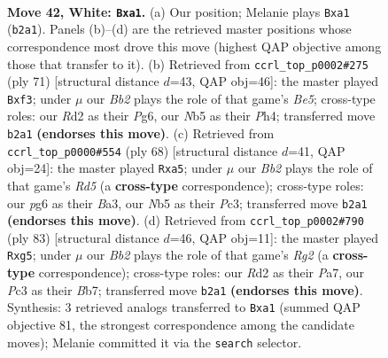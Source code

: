 \documentclass[11pt]{article}
\begin{document}
\clearpage

\begin{figure}[p]\centering
\begin{subfigure}{0.46\textwidth}\centering
\resizebox{\linewidth}{!}{%
\newchessgame
\chessboard[
  setfen={5k2/1p2p2p/n5p1/pNp5/5r1P/2P2P2/PB1R4/n4K2 w - - 0 42},
  showmover=false,
  pgfstyle=straightmove, color=movearrow, markmove={b2-a1}
]}
\caption{}
\end{subfigure}\hfill
\begin{subfigure}{0.46\textwidth}\centering
\resizebox{\linewidth}{!}{%
\newchessgame
\chessboard[
  setfen={6k1/8/1p3pp1/3p4/4bP1p/2P2N1P/rP1R1KP1/8 b - - 1 36},
  showmover=false,
  pgfstyle=straightmove, color=movearrow, markmove={e4-f3}
]}
\caption{}
\end{subfigure}
\\[4pt]
\begin{subfigure}{0.46\textwidth}\centering
\resizebox{\linewidth}{!}{%
\newchessgame
\chessboard[
  setfen={3r2k1/7p/3P1pp1/p2R1n2/2p2P2/B1P5/2P2K1P/8 w - - 2 35},
  showmover=false,
  pgfstyle=straightmove, color=movearrow, markmove={d5-a5}
]}
\caption{}
\end{subfigure}\hfill
\begin{subfigure}{0.46\textwidth}\centering
\resizebox{\linewidth}{!}{%
\newchessgame
\chessboard[
  setfen={4k3/pb4r1/1p1p4/1P1Pp1Bp/4P3/PK4P1/8/1N5R b - - 0 42},
  showmover=false,
  pgfstyle=straightmove, color=movearrow, markmove={g7-g5}
]}
\caption{}
\end{subfigure}
\caption{\textbf{Move 42, White: \texttt{Bxa1}.} (a) Our position; Melanie plays \texttt{Bxa1} (\texttt{b2a1}). Panels (b)--(d) are the retrieved master positions whose correspondence most drove this move (highest QAP objective among those that transfer to it). (b) Retrieved from \texttt{ccrl\_top\_p0002\#275} (ply 71) [structural distance $d$=43, QAP obj=46]: the master played \texttt{Bxf3}; under $\mu$ our \emph{Bb2} plays the role of that game's \emph{Be5}; cross-type roles: our \emph{R}d2 as their \emph{P}g6, our \emph{N}b5 as their \emph{P}h4; transferred move \texttt{b2a1} \textbf{(endorses this move)}. (c) Retrieved from \texttt{ccrl\_top\_p0000\#554} (ply 68) [structural distance $d$=41, QAP obj=24]: the master played \texttt{Rxa5}; under $\mu$ our \emph{Bb2} plays the role of that game's \emph{Rd5} (a \textbf{cross-type} correspondence); cross-type roles: our \emph{p}g6 as their \emph{B}a3, our \emph{N}b5 as their \emph{P}c3; transferred move \texttt{b2a1} \textbf{(endorses this move)}. (d) Retrieved from \texttt{ccrl\_top\_p0002\#790} (ply 83) [structural distance $d$=46, QAP obj=11]: the master played \texttt{Rxg5}; under $\mu$ our \emph{Bb2} plays the role of that game's \emph{Rg2} (a \textbf{cross-type} correspondence); cross-type roles: our \emph{R}d2 as their \emph{P}a7, our \emph{P}c3 as their \emph{B}b7; transferred move \texttt{b2a1} \textbf{(endorses this move)}. Synthesis: 3 retrieved analogs transferred to \texttt{Bxa1} (summed QAP objective 81, the strongest correspondence among the candidate moves); Melanie committed it via the \texttt{search} selector.}
\label{fig:thought-m82}
\end{figure}
\end{document}
